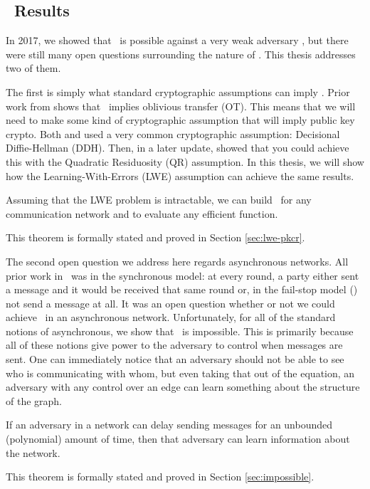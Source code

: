 \subsection{\THC~Results}
In 2017, we showed that \THC~is possible against a very weak adversary \cite{ALM17}, but there were still many open questions surrounding the nature of \THC. This thesis addresses two of them.

The first is simply what standard cryptographic assumptions can imply \THC. Prior work from \cite{BBMM18} shows that \THC~implies oblivious transfer (OT). This means that we will need to make some kind of cryptographic assumption that will imply public key crypto. Both \cite{EC:AkaMor17} and \cite{ALM17} used a very common cryptographic assumption: Decisional Diffie-Hellman (DDH). Then, in a later update, \cite{EPRINT:AkaLaVMor17,RioMasters17} showed that you could achieve this with the Quadratic Residuosity (QR) assumption. In this thesis, we will show how the Learning-With-Errors (LWE) assumption can achieve the same results.

\begin{theorem*}
	Assuming that the LWE problem is intractable, we can build \THC~for any communication network and to evaluate any efficient function.
\end{theorem*}
This theorem is formally stated and proved in Section \ref{sec:lwe-pkcr}.

The second open question we address here regards asynchronous networks. All prior work in \THC~was in the synchronous model: at every round, a party either sent a message and it would be received that same round or, in the fail-stop model (\cite{BBMM18,LLMMMT18}) not send a message at all. It was an open question whether or not we could achieve \THC~in an asynchronous network. Unfortunately, for all of the standard notions of asynchronous, we show that \THC~is impossible. This is primarily because all of these notions give power to the adversary to control when messages are sent. One can immediately notice that an adversary should not be able to see who is communicating with whom, but even taking that out of the equation, an adversary with any control over an edge can learn something about the structure of the graph. 
\begin{theorem*}
	If an adversary in a network can delay sending messages for an unbounded (polynomial) amount of time, then that adversary can learn information about the network.
\end{theorem*}
This theorem is formally stated and proved in Section \ref{sec:impossible}.

